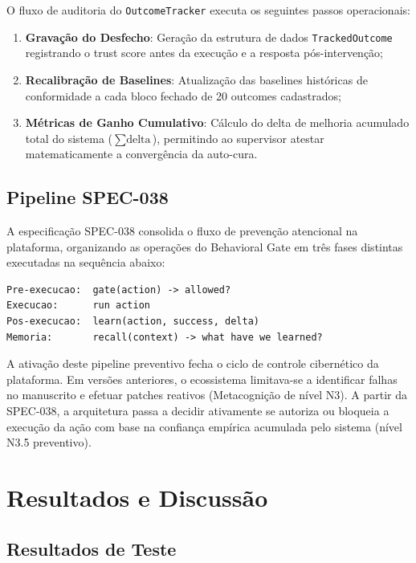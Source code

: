 \documentclass[12pt,a4paper,oneside]{abntex2}
\begin{document}
O fluxo de auditoria do \texttt{OutcomeTracker} executa os seguintes passos operacionais:

\begin{enumerate}
    \item \textbf{Gravação do Desfecho}: Geração da estrutura de dados \texttt{TrackedOutcome} registrando o trust score antes da execução e a resposta pós-intervenção;
    \item \textbf{Recalibração de Baselines}: Atualização das baselines históricas de conformidade a cada bloco fechado de 20 outcomes cadastrados;
    \item \textbf{Métricas de Ganho Cumulativo}: Cálculo do delta de melhoria acumulado total do sistema ($\sum \text{delta}$), permitindo ao supervisor atestar matematicamente a convergência da auto-cura.
\end{enumerate}

\section{Pipeline SPEC-038}

A especificação SPEC-038 consolida o fluxo de prevenção atencional na plataforma, organizando as operações do Behavioral Gate em três fases distintas executadas na sequência abaixo:

\begin{verbatim}
Pre-execucao:  gate(action) -> allowed?
Execucao:      run action
Pos-execucao:  learn(action, success, delta)
Memoria:       recall(context) -> what have we learned?
\end{verbatim}

A ativação deste pipeline preventivo fecha o ciclo de controle cibernético da plataforma. Em versões anteriores, o ecossistema limitava-se a identificar falhas no manuscrito e efetuar patches reativos (Metacognição de nível N3). A partir da SPEC-038, a arquitetura passa a decidir ativamente se autoriza ou bloqueia a execução da ação com base na confiança empírica acumulada pelo sistema (nível N3.5 preventivo).

\chapter{Resultados e Discussão}
\label{ch:resultados}

\section{Resultados de Teste}
\end{document}
